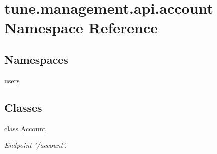 \hypertarget{namespacetune_1_1management_1_1api_1_1account}{\section{tune.\-management.\-api.\-account Namespace Reference}
\label{namespacetune_1_1management_1_1api_1_1account}
}
\subsection*{Namespaces}
\begin{DoxyCompactItemize}
\item 
\hyperlink{namespacetune_1_1management_1_1api_1_1account_1_1users}{users}
\end{DoxyCompactItemize}
\subsection*{Classes}
\begin{DoxyCompactItemize}
\item 
class \hyperlink{classtune_1_1management_1_1api_1_1account_1_1Account}{Account}
\begin{DoxyCompactList}\small\item\em Endpoint '/account'. \end{DoxyCompactList}\end{DoxyCompactItemize}
